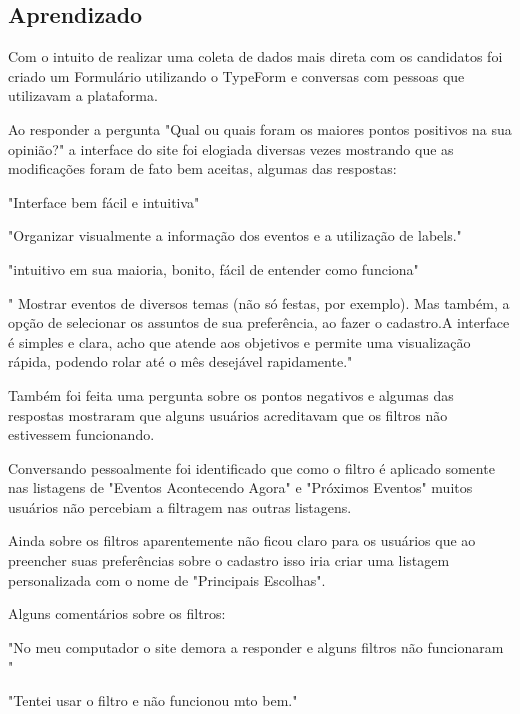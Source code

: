 \subsection{Aprendizado}
\par Com o intuito de realizar uma coleta de dados mais direta com os candidatos foi criado um Formulário utilizando o TypeForm e conversas com pessoas que utilizavam a plataforma.
\par Ao responder a pergunta "Qual ou quais foram os maiores pontos positivos na sua opinião?" a interface do site foi elogiada diversas vezes mostrando que as modificações foram de fato bem aceitas, algumas das respostas:
\par "Interface bem fácil e intuitiva"
\par "Organizar visualmente a informação dos eventos e a utilização de labels."
\par "intuitivo em sua maioria, bonito, fácil de entender como funciona"
\par " Mostrar eventos de diversos temas (não só festas, por exemplo). Mas também, a
opção de selecionar os assuntos de sua preferência, ao fazer o cadastro.A interface é simples e clara, acho que atende aos objetivos e permite uma visualização rápida, podendo rolar até o mês desejável rapidamente."

\par Também foi feita uma pergunta sobre os pontos negativos e algumas das respostas mostraram que alguns usuários acreditavam que os filtros não estivessem funcionando.
\par Conversando pessoalmente foi identificado que como o filtro é aplicado somente nas listagens de "Eventos Acontecendo Agora" e "Próximos Eventos" muitos usuários não percebiam a filtragem nas outras listagens.
\par Ainda sobre os filtros aparentemente não ficou claro para os usuários que ao preencher suas preferências sobre o cadastro isso iria criar uma listagem personalizada com o nome de "Principais Escolhas".
\par Alguns comentários sobre os filtros:
\par "No meu computador o site demora a responder e alguns filtros não funcionaram "
\par "Tentei usar o filtro e não funcionou mto bem."

